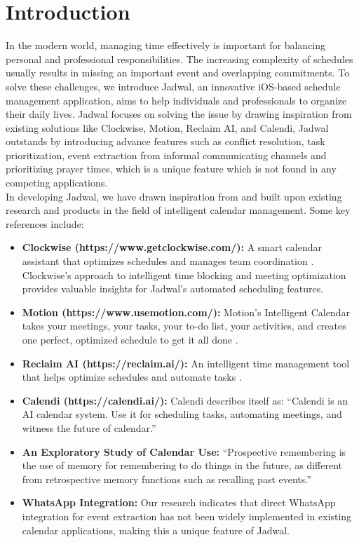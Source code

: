 \documentclass[12pt,a4paper]{report}
\begin{document}
\section{Introduction}
In the modern world, managing time effectively is important for balancing personal and professional responsibilities. The increasing complexity of schedules usually results in missing an important event and overlapping commitments. To solve these challenges, we introduce Jadwal, an innovative iOS-based schedule management application, aims to help individuals and professionals to organize their daily lives.
Jadwal focuses on solving the issue by drawing inspiration from existing solutions like Clockwise, Motion, Reclaim AI, and Calendi, Jadwal outstands by introducing advance features such as conflict resolution, task prioritization, event extraction from informal communicating channels and prioritizing prayer times, which is a unique feature which is not found in any competing applications. 
\\
In developing Jadwal, we have drawn inspiration from and built upon existing research and products in the field of intelligent calendar management. Some key references include:
\begin{itemize}
    \item \textbf{Clockwise (https://www.getclockwise.com/):} A smart calendar assistant that optimizes schedules and manages team coordination \cite{clockwise}. Clockwise's approach to intelligent time blocking and meeting optimization provides valuable insights for Jadwal's automated scheduling features.
    \item \textbf{Motion (https://www.usemotion.com/):} Motion's Intelligent Calendar takes your meetings, your tasks, your to-do list, your activities, and creates one perfect, optimized schedule to get it all done \cite{motion}.
    \item \textbf{Reclaim AI (https://reclaim.ai/):} An intelligent time management tool that helps optimize schedules and automate tasks \cite{reclaim}.
    \item \textbf{Calendi (https://calendi.ai/):} Calendi describes itself as: ``Calendi is an AI calendar system. Use it for scheduling tasks, automating meetings, and witness the future of calendar.'' \cite{calendi}
    \item \textbf{An Exploratory Study of Calendar Use:} ``Prospective remembering is the use of memory for remembering to do things in the future, as different from retrospective memory functions such as recalling past events.'' \cite{tungare2008exploratorystudycalendaruse}
    \item \textbf{WhatsApp Integration:} Our research indicates that direct WhatsApp integration for event extraction has not been widely implemented in existing calendar applications, making this a unique feature of Jadwal.
\end{itemize}
\end{document}
